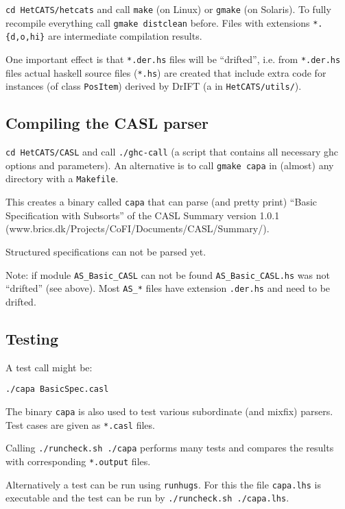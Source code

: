 \documentclass{article}
\begin{document}
\texttt{cd HetCATS/hetcats} and call \texttt{make} (on Linux) or
\texttt{gmake} (on Solaris). To fully recompile everything call
\texttt{gmake distclean} before. Files with extensions
\texttt{*.\{d,o,hi\}} are intermediate compilation results.

One important effect is that \texttt{*.der.hs} files will be
``drifted'', i.e.  from \texttt{*.der.hs} files actual haskell source
files (\texttt{*.hs}) are created that include extra code for
instances (of class \texttt{PosItem}) derived by DrIFT (a in
\texttt{HetCATS/utils/}).

\subsection{Compiling the CASL parser}

\texttt{cd HetCATS/CASL} and call \texttt{./ghc-call} (a script that
contains all necessary ghc options and parameters). An alternative is to call \texttt{gmake capa} in (almost) any directory with a \texttt{Makefile}.

This creates a binary called \texttt{capa} that can parse (and pretty
print) ``Basic Specification with Subsorts'' of the CASL Summary
version 1.0.1 \\ (www.brics.dk/Projects/CoFI/Documents/CASL/Summary/).

Structured specifications can not be parsed yet.

Note: if module \texttt{AS\_Basic\_CASL} can not be found
\texttt{AS\_Basic\_CASL.hs} was not ``drifted'' (see above). Most
\texttt{AS\_*} files have extension \texttt{.der.hs} and need to
be drifted.

\subsection{Testing}

A test call might be: 

\texttt{./capa BasicSpec.casl}

The binary \texttt{capa} is also used to test various subordinate (and
mixfix) parsers. Test cases are given as \texttt{*.casl} files.

Calling \texttt{./runcheck.sh ./capa} performs many tests and compares the
results with corresponding \texttt{*.output} files.

Alternatively a test can be run using \texttt{runhugs}. For this the
file \texttt{capa.lhs} is executable and the test can be run
by \texttt{./runcheck.sh ./capa.lhs}.
\end{document}
